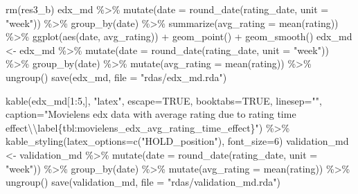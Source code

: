 \documentclass[
]{article}
\newenvironment{Shaded}{}{}
\newcommand{\AttributeTok}[1]{\textcolor[rgb]{0.49,0.56,0.16}{#1}}
\newcommand{\ConstantTok}[1]{\textcolor[rgb]{0.53,0.00,0.00}{#1}}
\newcommand{\DecValTok}[1]{\textcolor[rgb]{0.25,0.63,0.44}{#1}}
\newcommand{\FunctionTok}[1]{\textcolor[rgb]{0.02,0.16,0.49}{#1}}
\newcommand{\NormalTok}[1]{#1}
\newcommand{\OtherTok}[1]{\textcolor[rgb]{0.00,0.44,0.13}{#1}}
\newcommand{\SpecialCharTok}[1]{\textcolor[rgb]{0.25,0.44,0.63}{#1}}
\newcommand{\StringTok}[1]{\textcolor[rgb]{0.25,0.44,0.63}{#1}}
\begin{document}
\begin{Shaded}
\begin{Highlighting}[]
\FunctionTok{rm}\NormalTok{(res3\_b)}
\NormalTok{edx\_md }\SpecialCharTok{\%\textgreater{}\%} \FunctionTok{mutate}\NormalTok{(}\AttributeTok{date =} \FunctionTok{round\_date}\NormalTok{(rating\_date, }\AttributeTok{unit =} \StringTok{"week"}\NormalTok{)) }\SpecialCharTok{\%\textgreater{}\%}
  \FunctionTok{group\_by}\NormalTok{(date) }\SpecialCharTok{\%\textgreater{}\%}
  \FunctionTok{summarize}\NormalTok{(}\AttributeTok{avg\_rating =} \FunctionTok{mean}\NormalTok{(rating)) }\SpecialCharTok{\%\textgreater{}\%}
  \FunctionTok{ggplot}\NormalTok{(}\FunctionTok{aes}\NormalTok{(date, avg\_rating)) }\SpecialCharTok{+}
  \FunctionTok{geom\_point}\NormalTok{() }\SpecialCharTok{+}
  \FunctionTok{geom\_smooth}\NormalTok{()}
\NormalTok{edx\_md }\OtherTok{\textless{}{-}}\NormalTok{ edx\_md }\SpecialCharTok{\%\textgreater{}\%} \FunctionTok{mutate}\NormalTok{(}\AttributeTok{date =} \FunctionTok{round\_date}\NormalTok{(rating\_date, }\AttributeTok{unit =} \StringTok{"week"}\NormalTok{)) }\SpecialCharTok{\%\textgreater{}\%}
  \FunctionTok{group\_by}\NormalTok{(date) }\SpecialCharTok{\%\textgreater{}\%}
  \FunctionTok{mutate}\NormalTok{(}\AttributeTok{avg\_rating =} \FunctionTok{mean}\NormalTok{(rating)) }\SpecialCharTok{\%\textgreater{}\%} \FunctionTok{ungroup}\NormalTok{()}
\FunctionTok{save}\NormalTok{(edx\_md, }\AttributeTok{file =} \StringTok{"rdas/edx\_md.rda"}\NormalTok{)}

\FunctionTok{kable}\NormalTok{(edx\_md[}\DecValTok{1}\SpecialCharTok{:}\DecValTok{5}\NormalTok{,], }\StringTok{"latex"}\NormalTok{, }\AttributeTok{escape=}\ConstantTok{TRUE}\NormalTok{, }\AttributeTok{booktabs=}\ConstantTok{TRUE}\NormalTok{, }\AttributeTok{linesep=}\StringTok{""}\NormalTok{, }\AttributeTok{caption=}\StringTok{"Movielens edx data with average rating due to rating time effect}\SpecialCharTok{\textbackslash{}\textbackslash{}}\StringTok{label\{tbl:movielens\_edx\_avg\_rating\_time\_effect\}"}\NormalTok{) }\SpecialCharTok{\%\textgreater{}\%}
    \FunctionTok{kable\_styling}\NormalTok{(}\AttributeTok{latex\_options=}\FunctionTok{c}\NormalTok{(}\StringTok{"HOLD\_position"}\NormalTok{), }\AttributeTok{font\_size=}\DecValTok{6}\NormalTok{)}
\NormalTok{validation\_md }\OtherTok{\textless{}{-}}\NormalTok{ validation\_md }\SpecialCharTok{\%\textgreater{}\%} \FunctionTok{mutate}\NormalTok{(}\AttributeTok{date =} \FunctionTok{round\_date}\NormalTok{(rating\_date, }\AttributeTok{unit =} \StringTok{"week"}\NormalTok{)) }\SpecialCharTok{\%\textgreater{}\%}
  \FunctionTok{group\_by}\NormalTok{(date) }\SpecialCharTok{\%\textgreater{}\%}
  \FunctionTok{mutate}\NormalTok{(}\AttributeTok{avg\_rating =} \FunctionTok{mean}\NormalTok{(rating)) }\SpecialCharTok{\%\textgreater{}\%} \FunctionTok{ungroup}\NormalTok{()}
\FunctionTok{save}\NormalTok{(validation\_md, }\AttributeTok{file =} \StringTok{"rdas/validation\_md.rda"}\NormalTok{)}


\end{Highlighting}
\end{Shaded}
\end{document}
